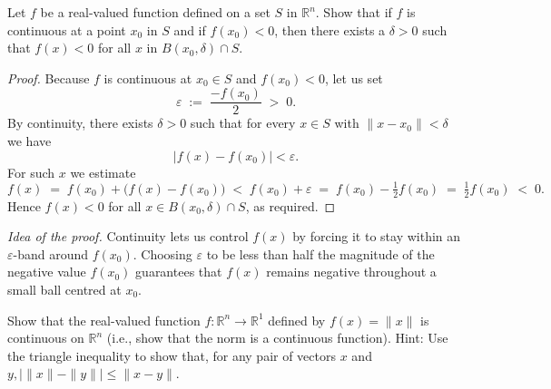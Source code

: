 \documentclass[10pt]{extarticle}
\begin{document}
\begin{exercise}[5.4]
    Let $f$ be a real-valued function defined on a set $S$ in $\mathbb{R} ^n$. Show that if $f$ is continuous at a point $x _0$ in $S$ and if $f\left( x _0\right)<0$, then there exists a $\delta>0$ such that $f( x )<0$ for all $x$ in $B\left( x _0, \delta\right) \cap S$.
\end{exercise}

\begin{proof}
    Because $f$ is continuous at $x_{0}\in S$ and $f(x_{0})<0$, let us set
    \[
        \varepsilon\;:=\;\frac{-f(x_{0})}{2}\;>\;0.
    \]
    By continuity, there exists $\delta>0$ such that for every $x\in S$ with $\|x-x_{0}\|<\delta$ we have
    \[
        |f(x)-f(x_{0})|<\varepsilon.
    \]
    For such $x$ we estimate
    \[
        f(x)\;=\;f(x_{0})+\bigl(f(x)-f(x_{0})\bigr)\;<\;f(x_{0})+\varepsilon\;=\;f(x_{0})-\tfrac12 f(x_{0})\;=\;\tfrac12 f(x_{0})\;<\;0.
    \]
    Hence $f(x)<0$ for all $x\in B(x_{0},\delta)\cap S$, as required.
\end{proof}

\begin{remark}
    \emph{Idea of the proof.}  Continuity lets us control $f(x)$ by forcing it to stay within an $\varepsilon$-band around $f(x_{0})$.  Choosing $\varepsilon$ to be less than half the magnitude of the negative value $f(x_{0})$ guarantees that $f(x)$ remains negative throughout a small ball centred at $x_{0}$.
\end{remark}

\begin{exercise}[5.5]
    Show that the real-valued function $f: \mathbb{R} ^n \rightarrow \mathbb{R} ^1$ defined by $f( x )=\| x \|$ is continuous on $\mathbb{R} ^n$ (i.e., show that the norm is a continuous function). Hint: Use the triangle inequality to show that, for any pair of vectors $x$ and $y ,|\| x \|-\| y \|| \leqslant\| x - y \|$.
\end{exercise}
\end{document}
